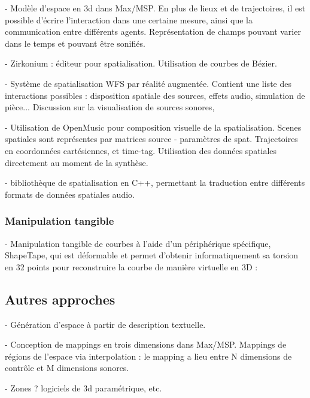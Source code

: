 \documentclass[french,12pt]{article}
\begin{document}
- Modèle d'espace en 3d dans Max/MSP. En plus de lieux et de trajectoires, il est possible d'écrire l'interaction dans une certaine mesure, ainsi que la communication entre différents agents. Représentation de champs pouvant varier dans le temps et pouvant être sonifiés.
\cite{wakefield_cosm:_2011}

- Zirkonium : éditeur pour spatialisation. Utilisation de courbes de Bézier. 
\cite{wagner_introducing_2014}

- Système de spatialisation \ac{WFS} par réalité augmentée. Contient une liste des interactions possibles : disposition spatiale des sources, effets audio, simulation de pièce... Discussion sur la visualisation de sources sonores, 
\cite{melchior_authoring_2005} 

- Utilisation de OpenMusic pour composition visuelle de la spatialisation. Scenes spatiales sont représentes par matrices source - paramètres de spat. Trajectoires en coordonnées cartésiennes, et time-tag. Utilisation des données spatiales directement au moment de la synthèse.
\cite{bresson_spatial_2012}

- bibliothèque de spatialisation en C++, permettant la traduction entre différents formats de données spatiales audio.
\cite{wozniewski_spatosc:_2012}

\subsubsection{Manipulation tangible}
- Manipulation tangible de courbes à l'aide d'un périphérique spécifique, ShapeTape, qui est déformable et permet d'obtenir informatiquement sa torsion en 32 points pour reconstruire la courbe de manière virtuelle en 3D : 
\cite{grossman_interface_2003}

\subsection{Autres approches}
- Génération d'espace à partir de description textuelle.
\cite{andriamarozakaniaina_du_2012} 

- Conception de mappings en trois dimensions dans Max/MSP. Mappings de régions de l'espace via interpolation : le mapping a lieu entre N dimensions de contrôle et M dimensions sonores.
\cite{van_nort_lom_2006}

 - Zones ? logiciels de 3d paramétrique, etc. %
\end{document}
